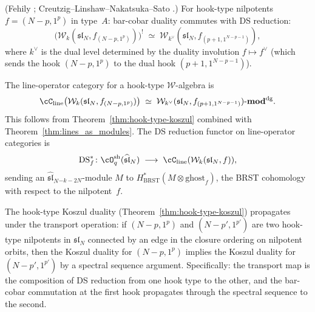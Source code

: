 \begin{theorem}
\textup{(Fehily \cite{Feh23}; Creutzig--Linshaw--Nakatsuka--Sato
\cite{CLNS24}.)}
For hook-type nilpotents $f=(N-p,1^p)$ in type~$A$:
bar-cobar duality commutes with DS reduction:
\begin{equation}
\bigl(\mathcal{W}_k(\mathfrak{sl}_N,f_{(N-p,1^p)})\bigr)^!
\;\simeq\;
\mathcal{W}_{k^\vee}(\mathfrak{sl}_N,f_{(p+1,1^{N-p-1})}),
\end{equation}
where $k^\vee$ is the dual level determined by the duality
involution $f\mapsto f^\vee$ (which sends the hook
$(N-p,1^p)$ to the dual hook $(p+1,1^{N-p-1})$).
\end{theorem}

\begin{construction}
The line-operator category for a hook-type
$\mathcal{W}$-algebra is
\begin{equation}
\cC_{\mathrm{line}}
\bigl(\mathcal{W}_k(\mathfrak{sl}_N,f_{(N-p,1^p)})\bigr)
\;\simeq\;
\mathcal{W}_{k^\vee}(\mathfrak{sl}_N,f_{(p+1,1^{N-p-1})})
\text{-}\mathbf{mod}^{\mathrm{dg}}.
\end{equation}
This follows from Theorem~\ref{thm:hook-type-koszul}
combined with Theorem~\ref{thm:lines_as_modules}.
The DS reduction functor on line-operator categories
is
\begin{equation}
\mathrm{DS}_{f}^*\colon
\cO_q^{\mathrm{sh}}(\widehat{\mathfrak{sl}}_N)
\;\longrightarrow\;
\cC_{\mathrm{line}}
(\mathcal{W}_k(\mathfrak{sl}_N,f)),
\end{equation}
sending an $\widehat{\mathfrak{sl}}_N{}_{-k-2N}$-module
$M$ to $H^*_{\mathrm{BRST}}(M\otimes\mathrm{ghost}_f)$,
the BRST cohomology with respect to the nilpotent~$f$.
\end{construction}

\begin{proposition}
The hook-type Koszul duality
(Theorem~\textup{\ref{thm:hook-type-koszul}}) propagates under
the transport operation: if $(N-p,1^p)$ and $(N-p',1^{p'})$
are two hook-type nilpotents in $\mathfrak{sl}_N$ connected
by an edge in the closure ordering on nilpotent orbits, then
the Koszul duality for $(N-p,1^p)$ implies the Koszul
duality for $(N-p',1^{p'})$ by a spectral sequence argument.
Specifically: the transport map is the composition of
DS reduction from one hook type to the other, and the bar-cobar
commutation at the first hook propagates through the spectral
sequence to the second.
\end{proposition}

